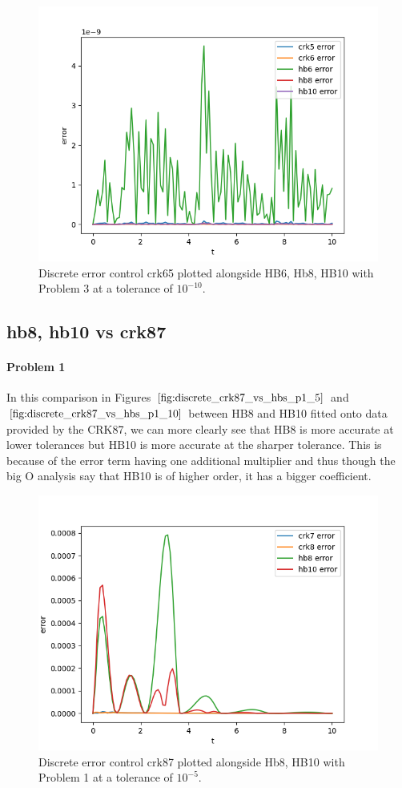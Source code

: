 \begin{figure}[H]
\centering
\includegraphics[width=0.7\linewidth]{./figures/discrete_crk65_vs_hbs_p3_10}
\caption{Discrete error control crk65 plotted alongside HB6, Hb8, HB10 with Problem 3 at a tolerance of $10^{-10}$.}
\label{fig:discrete_crk65_vs_hbs_p3_10}
\end{figure}

\subsection{hb8, hb10 vs crk87}

\paragraph{Problem 1} In this comparison in Figures $\ref{fig:discrete_crk87_vs_hbs_p1_5}$ and $\ref{fig:discrete_crk87_vs_hbs_p1_10}$ between HB8 and HB10 fitted onto data provided by the CRK87, we can more clearly see that HB8 is more accurate at lower tolerances but HB10 is more accurate at the sharper tolerance. This is because of the error term having one additional multiplier and thus though the big O analysis say that HB10 is of higher order, it has a bigger coefficient.

\begin{figure}[H]
\centering
\includegraphics[width=0.7\linewidth]{./figures/discrete_crk87_vs_hbs_p1_5}
\caption{Discrete error control crk87 plotted alongside Hb8, HB10 with Problem 1 at a tolerance of $10^{-5}$.}
\label{fig:discrete_crk87_vs_hbs_p1_5}
\end{figure}

